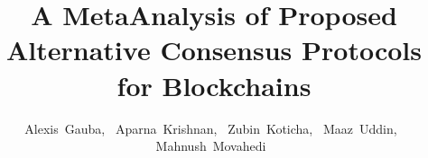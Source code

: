 \documentclass[10pt,journal,compsoc]{IEEEtran}
\begin{document}
%
\title{A MetaAnalysis of Proposed Alternative Consensus Protocols for Blockchains}
%
%
%
%

\author{Alexis~Gauba,~\IEEEmembership{}
        Aparna~Krishnan,~\IEEEmembership{}
        Zubin~Koticha,~\IEEEmembership{}
        Maaz~Uddin,~\IEEEmembership{}
        Mahnush~Movahedi~\IEEEmembership{}}%
        
\end{document}
